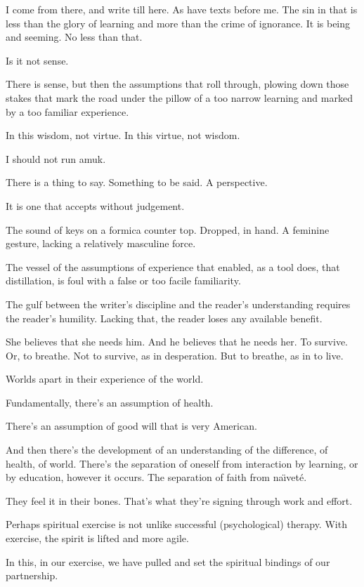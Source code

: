 I come from there, and write till here.  As have texts before me.  The
sin in that is less than the glory of learning and more than the crime
of ignorance.  It is being and seeming.  No less than that.

Is it not sense.  

There is sense, but then the assumptions that roll through, plowing
down those stakes that mark the road under the pillow of a too narrow
learning and marked by a too familiar experience.

In this wisdom, not virtue.  In this virtue, not wisdom.

I should not run amuk.

There is a thing to say.  Something to be said.  A perspective.

It is one that accepts without judgement.

\vfill
\break


The sound of keys on a formica counter top. \break Dropped, in hand.
A feminine gesture, lacking a relatively masculine force.


The vessel of the assumptions of experience that enabled, as a tool
does, that distillation, is foul with a false or too facile
familiarity.

\vfill
\break


The gulf between the writer's discipline and the \break reader's
understanding requires the reader's humility. \break Lacking that, the
reader loses any available benefit.

\vfill
\break


She believes that she needs him.  And he believes that he needs her.
To survive.  Or, to breathe.  Not to survive, as in desperation.  But
to breathe, as in to live.

\vfill
\break


Worlds apart in their experience of the world.

Fundamentally, there's an assumption of health.  

There's an assumption of good will that is very \break American.

And then there's the development of an \break understanding of the
difference, of health, of world.  \break There's the separation of
oneself from interaction by learning, or by education, however it
occurs.  The separation of faith from na\"{\i}vet\'{e}.

They feel it in their bones.  That's what they're signing through work
and effort.


\vfill
\break


Perhaps spiritual exercise is not unlike successful (psychological)
therapy.  With exercise, the spirit is \break lifted and more agile.

In this, in our exercise, we have pulled and set the spiritual
bindings of our partnership.


\vfill
\bye
